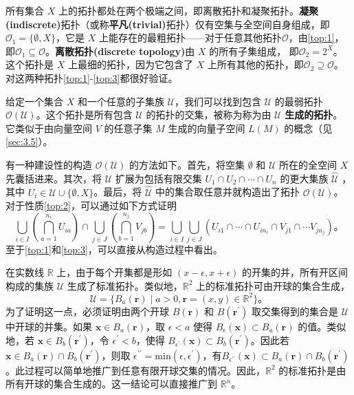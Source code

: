 \begin{eg}\label{eg:10.7}
	所有集合 $X$ 上的拓扑都处在两个极端之间，即离散拓扑和凝聚拓扑。\textbf{凝聚(indiscrete)}拓扑（或称\textbf{平凡(trivial)}拓扑）仅有空集与全空间自身组成，即$\mathcal{O}_{1} =\{\emptyset ,X\}$，它是 $X$ 上能存在的最粗拓扑——对于任意其他拓扑$\mathcal{O}$，由\ref{top:1}，即$\mathcal{O}_{1} \subseteq \mathcal{O}$。\textbf{离散拓扑(discrete topology)}由 $X$ 的所有子集组成， 即$\mathcal{O}_{2} =2^{X}$。这个拓扑是 $X$ 上最细的拓扑，因为它包含了 $X$ 上所有其他的拓扑，即$\mathcal{O}_{2} \supseteq \mathcal{O}$。对这两种拓扑\ref{top:1}-\ref{top:3}都很好验证。
\end{eg}

	给定一个集合 $X$ 和一个任意的子集族 $\mathcal{U}$，我们可以找到包含 $\mathcal{U}$ 的最弱拓扑 $\mathcal{O} (\mathcal{U} )$。这个拓扑是所有包含 $\mathcal{U}$ 的拓扑的交集，被称为称为由 $\mathcal{U}$ \textbf{生成的拓扑}。它类似于由向量空间 $V$ 的任意子集 $M$ 生成的向量子空间 $L(M)$ 的概念（见\ref{sec:3.5}）。

	有一种建设性的构造 $\mathcal{O} (\mathcal{U} )$ 的方法如下。首先，将空集 $\emptyset $ 和 $\mathcal{U}$ 所在的全空间 $X$ 先囊括进来。其次，将 $\mathcal{U}$ 扩展为包括有限交集 $U_{1} \cap U_{2} \cap \cdots \cap U_{n}$ 的更大集族 $\hat{\mathcal{U}}$ ，其中 $U_{i} \in \mathcal{U} \cup \{\emptyset ,X\}$。最后，将 $\hat{\mathcal{U}}$ 中的集合取任意并就构造出了拓扑 $\mathcal{O} (\mathcal{U} )$。对于性质\ref{top:2}，可以通过如下方式证明
\begin{equation*}
    \bigcup _{i\in I}\left(\bigcap _{a=1}^{n_{i}} U_{ia}\right) \cap \bigcup _{j\in J}\left(\bigcap _{b=1}^{n_{j}} V_{jb}\right) =\bigcup _{i\in I}\bigcup _{j\in J}( U_{i1} \cap \cdots \cap U_{in_{i}} \cap V_{j1} \cap \cdots V_{jn_{j}}) 。
\end{equation*}
至于\ref{top:1}和\ref{top:3}，可以直接从构造过程中看出。

\begin{eg}\label{eg:10.8}
	在实数线 $\mathbb{R}$ 上，由于每个开集都是形如 $(x-\epsilon ,x+\epsilon )$ 的开集的并，所有开区间构成的集族 $\mathcal{U}$ 生成了标准拓扑。类似地，$\mathbb{R}^{2}$ 上的标准拓扑可由开球的集合生成，
\begin{equation*}
    \mathcal{U} =\{B_{a} (\mathbf{r} )\mid a >0,\mathbf{r} =( x,y) \in \mathbb{R}^{2} \}。
\end{equation*}
为了证明这一点，必须证明由两个开球 $B(\mathbf{r} )$ 和 $B(\mathbf{r} ^{\prime})$ 取交集得到的集合是 $\mathcal{U}$ 中开球的并集。如果 $\mathbf{x} \in B_{a} (\mathbf{r} )$，取 $\epsilon < a$ 使得 $B_{\epsilon } (\mathbf{x} )\subset B_{a} (\mathbf{r} )$ 的值。类似地，若 $\mathbf{x} \in B_{b} (\mathbf{r} ^{\prime})$，令 $\epsilon ^{\prime}< b$，使得 $B_{\epsilon ^{\prime}} (\mathbf{x} )\subset B_{b} (\mathbf{r} ^{\prime})$。因此若 $\mathbf{x} \in B_{a} (\mathbf{r} )\cap B_{b} (\mathbf{r} ^{\prime})$，则取 $\epsilon ^{\prime \prime}=\mathrm{min}( \epsilon ,\epsilon ^{\prime})$，有$B_{\epsilon ^{\prime \prime}} (\mathbf{x} )\subset B_{a} (\mathbf{r} )\cap B_{b} (\mathbf{r} ^{\prime})$。此过程可以简单地推广到任意有限开球交集的情况。因此，$\mathbb{R}^{2}$ 的标准拓扑是由所有开球的集合生成的。这一结论可以直接推广到 $\mathbb{R}^{n}$。
\end{eg}


